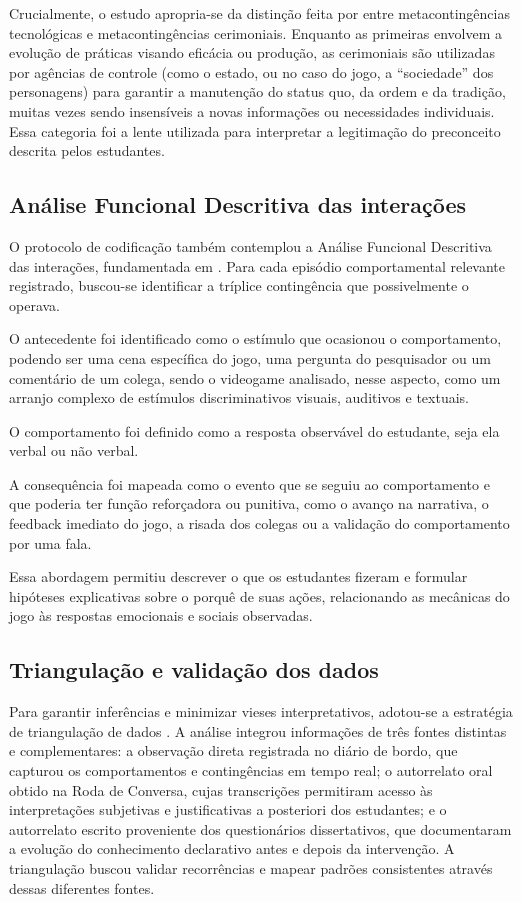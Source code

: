 \documentclass[portuguese]{textolivre}
\begin{document}
Crucialmente, o estudo apropria-se da distinção feita por \textcite{todorov2004analise} entre metacontingências tecnológicas e metacontingências cerimoniais. Enquanto as primeiras envolvem a evolução de práticas visando eficácia ou produção, as cerimoniais são utilizadas por agências de controle (como o estado, ou no caso do jogo, a “sociedade” dos personagens) para garantir a manutenção do status quo, da ordem e da tradição, muitas vezes sendo insensíveis a novas informações ou necessidades individuais. Essa categoria foi a lente utilizada para interpretar a legitimação do preconceito descrita pelos estudantes.

\subsection{Análise Funcional Descritiva das interações}

O protocolo de codificação também contemplou a Análise Funcional Descritiva das interações, fundamentada em \textcite{skinner1974behaviorismo,baum2019compreender}. Para cada episódio comportamental relevante registrado, buscou-se identificar a tríplice contingência que possivelmente o operava.

O antecedente foi identificado como o estímulo que ocasionou o comportamento, podendo ser uma cena específica do jogo, uma pergunta do pesquisador ou um comentário de um colega, sendo o videogame analisado, nesse aspecto, como um arranjo complexo de estímulos discriminativos visuais, auditivos e textuais.

O comportamento foi definido como a resposta observável do estudante, seja ela verbal ou não verbal.

A consequência foi mapeada como o evento que se seguiu ao comportamento e que poderia ter função reforçadora ou punitiva, como o avanço na narrativa, o feedback imediato do jogo, a risada dos colegas ou a validação do comportamento por uma fala.

Essa abordagem permitiu descrever o que os estudantes fizeram e formular hipóteses explicativas sobre o porquê de suas ações, relacionando as mecânicas do jogo \cite{bogost2011how} às respostas emocionais e sociais observadas.

\subsection{Triangulação e validação dos dados}

Para garantir inferências e minimizar vieses interpretativos, adotou-se a estratégia de triangulação de dados \cite{creswell2017research}. A análise integrou informações de três fontes distintas e complementares: a observação direta registrada no diário de bordo, que capturou os comportamentos e contingências em tempo real; o autorrelato oral obtido na Roda de Conversa, cujas transcrições permitiram acesso às interpretações subjetivas e justificativas a posteriori dos estudantes; e o autorrelato escrito proveniente dos questionários dissertativos, que documentaram a evolução do conhecimento declarativo antes e depois da intervenção. A triangulação buscou validar recorrências e mapear padrões consistentes através dessas diferentes fontes.
\end{document}
